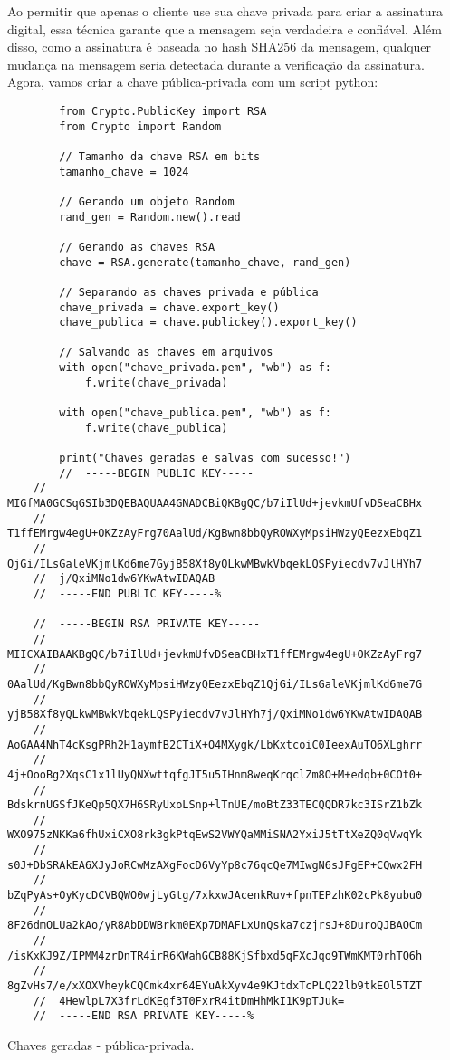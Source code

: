 \documentclass[a4paper,12pt]{article}
\newcommand{\printingbibliography}{%

    \pagestyle{myheadings}
    \markright{}
    \sloppy
    \printbibliography[heading=bibintoc, %
                   title=Refer\^encias %
                  ]
    \fussy%
}
\begin{document}
Ao permitir que apenas o cliente use sua chave privada para criar a assinatura digital, essa técnica 
garante que a mensagem seja verdadeira e confiável. Além disso, como a assinatura é baseada no hash 
SHA256 da mensagem, qualquer mudança na mensagem seria detectada durante a verificação da assinatura. 
Agora, vamos criar a chave p\'ublica-privada com um script python:

    \begin{listing}[!h]
        \begin{verbatim}
        from Crypto.PublicKey import RSA
        from Crypto import Random
    
        // Tamanho da chave RSA em bits
        tamanho_chave = 1024
    
        // Gerando um objeto Random
        rand_gen = Random.new().read
    
        // Gerando as chaves RSA
        chave = RSA.generate(tamanho_chave, rand_gen)
    
        // Separando as chaves privada e pública
        chave_privada = chave.export_key()
        chave_publica = chave.publickey().export_key()
    
        // Salvando as chaves em arquivos
        with open("chave_privada.pem", "wb") as f:
            f.write(chave_privada)
    
        with open("chave_publica.pem", "wb") as f:
            f.write(chave_publica)
    
        print("Chaves geradas e salvas com sucesso!")
        //  -----BEGIN PUBLIC KEY-----
    //  MIGfMA0GCSqGSIb3DQEBAQUAA4GNADCBiQKBgQC/b7iIlUd+jevkmUfvDSeaCBHx
    //  T1ffEMrgw4egU+OKZzAyFrg70AalUd/KgBwn8bbQyROWXyMpsiHWzyQEezxEbqZ1
    //  QjGi/ILsGaleVKjmlKd6me7GyjB58Xf8yQLkwMBwkVbqekLQSPyiecdv7vJlHYh7
    //  j/QxiMNo1dw6YKwAtwIDAQAB
    //  -----END PUBLIC KEY-----% 
    
    //  -----BEGIN RSA PRIVATE KEY-----
    //  MIICXAIBAAKBgQC/b7iIlUd+jevkmUfvDSeaCBHxT1ffEMrgw4egU+OKZzAyFrg7
    //  0AalUd/KgBwn8bbQyROWXyMpsiHWzyQEezxEbqZ1QjGi/ILsGaleVKjmlKd6me7G
    //  yjB58Xf8yQLkwMBwkVbqekLQSPyiecdv7vJlHYh7j/QxiMNo1dw6YKwAtwIDAQAB
    //  AoGAA4NhT4cKsgPRh2H1aymfB2CTiX+O4MXygk/LbKxtcoiC0IeexAuTO6XLghrr
    //  4j+OooBg2XqsC1x1lUyQNXwttqfgJT5u5IHnm8weqKrqclZm8O+M+edqb+0COt0+
    //  BdskrnUGSfJKeQp5QX7H6SRyUxoLSnp+lTnUE/moBtZ33TECQQDR7kc3ISrZ1bZk
    //  WXO975zNKKa6fhUxiCXO8rk3gkPtqEwS2VWYQaMMiSNA2YxiJ5tTtXeZQ0qVwqYk
    //  s0J+DbSRAkEA6XJyJoRCwMzAXgFocD6VyYp8c76qcQe7MIwgN6sJFgEP+CQwx2FH
    //  bZqPyAs+OyKycDCVBQWO0wjLyGtg/7xkxwJAcenkRuv+fpnTEPzhK02cPk8yubu0
    //  8F26dmOLUa2kAo/yR8AbDDWBrkm0EXp7DMAFLxUnQska7czjrsJ+8DuroQJBAOCm
    //  /isKxKJ9Z/IPMM4zrDnTR4irR6KWahGCB88KjSfbxd5qFXcJqo9TWmKMT0rhTQ6h
    //  8gZvHs7/e/xXOXVheykCQCmk4xr64EYuAkXyv4e9KJtdxTcPLQ22lb9tkEOl5TZT
    //  4HewlpL7X3frLdKEgf3T0FxrR4itDmHhMkI1K9pTJuk=
    //  -----END RSA PRIVATE KEY-----% 
    \end{verbatim}
    \caption{Chaves geradas - p\'ublica-privada.}
    \end{listing}

\printingbibliography
\end{document}
